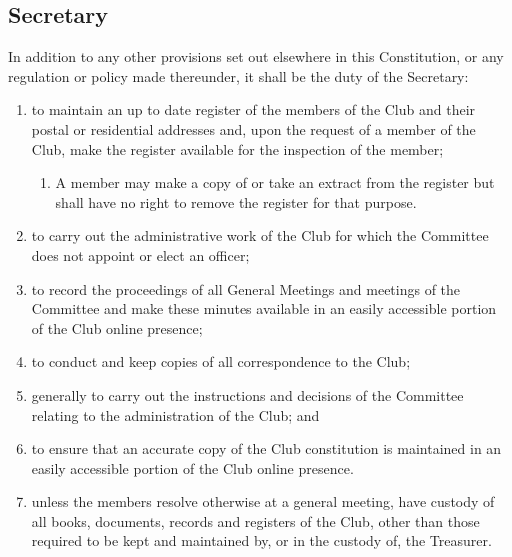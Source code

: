 \documentclass[11pt]{article} %
\begin{document}
\subsection{Secretary}
In addition to any other provisions set out elsewhere in this Constitution, or any regulation or policy made thereunder, it shall be the duty of the Secretary:
\begin{enumerate}
	\item to maintain an up to date register of the members of the Club and their postal or residential addresses and, upon the request of a member of the Club, make the register available for the inspection of the member;
		\begin{enumerate}
			\item A member may make a copy of or take an extract from the register but shall have no right to remove the register for that purpose.
		\end{enumerate}
	\item to carry out the administrative work of the Club for which the Committee does not appoint or elect an officer;
	\item to record the proceedings of all General Meetings and meetings of the Committee and make these minutes available in an easily accessible portion of the Club online presence;
	\item to conduct and keep copies of all correspondence to the Club;
	\item generally to carry out the instructions and decisions of the Committee relating to the administration of the Club; and
	\item to ensure that an accurate copy of the Club constitution is maintained in an easily accessible portion of the Club online presence.
	\item unless the members resolve otherwise at a general meeting, have custody of all books, documents, records and registers of the Club, other than those required to be kept and maintained by, or in the custody of, the Treasurer.
\end{enumerate}
\end{document}
